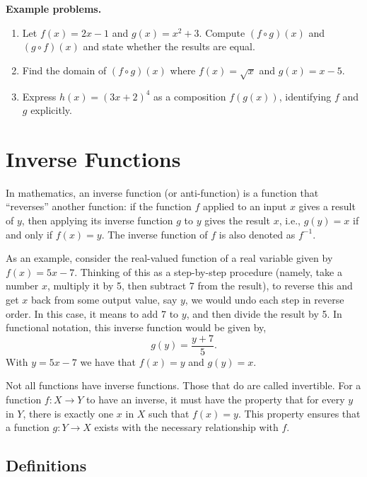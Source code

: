 \textbf{Example problems.}

\begin{enumerate}
    \item Let $f(x) = 2x - 1$ and $g(x) = x^2 + 3$. Compute $(f \circ g)(x)$ and $(g \circ f)(x)$ and state whether the results are equal.
    \item Find the domain of $(f \circ g)(x)$ where $f(x) = \sqrt{x}$ and $g(x) = x - 5$.
    \item Express $h(x) = (3x + 2)^4$ as a composition $f(g(x))$, identifying $f$ and $g$ explicitly.
\end{enumerate}

\section{Inverse Functions}
\label{sec:inve-f81e}

In mathematics, an inverse function (or anti-function) is a function that ``reverses'' another function: if the function $f$ applied to an input $x$ gives a result of $y$, then applying its inverse function $g$ to $y$ gives the result $x$, i.e., $g(y) = x$ if and only if $f(x) = y$. The inverse function of $f$ is also denoted as $f^{-1}$.

As an example, consider the real-valued function of a real variable given by $f(x) = 5x - 7$. Thinking of this as a step-by-step procedure (namely, take a number $x$, multiply it by 5, then subtract 7 from the result), to reverse this and get $x$ back from some output value, say $y$, we would undo each step in reverse order. In this case, it means to add 7 to $y$, and then divide the result by 5. In functional notation, this inverse function would be given by,
\[
g(y) = \frac{y + 7}{5}.
\]
With $y = 5x - 7$ we have that $f(x) = y$ and $g(y) = x$.

Not all functions have inverse functions. Those that do are called invertible. For a function $f: X \to Y$ to have an inverse, it must have the property that for every $y$ in $Y$, there is exactly one $x$ in $X$ such that $f(x) = y$. This property ensures that a function $g: Y \to X$ exists with the necessary relationship with $f$.

\subsection{Definitions}
\label{sss:defi-9fdc}

